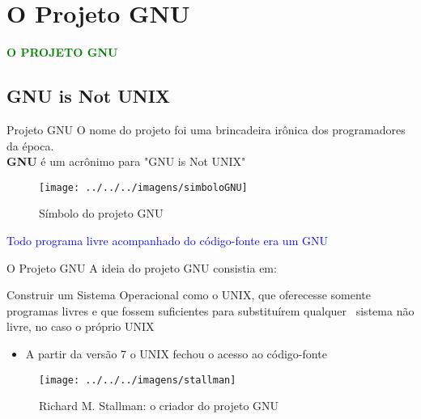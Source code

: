 \documentclass{beamer}
\begin{document}
\section{O Projeto GNU}
  \begin{frame}
     \begin{center}
        \Large{\textcolor{green}{\textbf{O PROJETO GNU}}}
     \end{center}
   \end{frame}
  \subsection{GNU is Not UNIX}
   \begin{frame}[t]{Projeto GNU}
      \centering
      O nome do projeto foi uma brincadeira irônica dos programadores da época. \\
      \vspace{\baselineskip}
      {\textbf{GNU} é um acrônimo para "\alert{G}NU is \alert{N}ot \alert{U}NIX"}
      {\begin{figure}
	\texttt{[image: ../../../imagens/simboloGNU]}
	\caption{Símbolo do projeto GNU}
      \end{figure}}
      {\begin{center}
	 \textcolor{blue}{Todo programa livre acompanhado do código-fonte era um GNU}
       \end{center}}
   \end{frame}

    \begin{frame}[t]{O Projeto GNU}
      A ideia do projeto GNU consistia em:
      \begin{itemize}
	\vspace{\baselineskip}
	{\item Construir um Sistema Operacional como o UNIX, que oferecesse somente programas livres e que fossem suficientes para substituírem qualquer \
	       sistema não livre, no caso o próprio UNIX}
	{\begin{itemize}
	 \item \alert{A partir da versão 7 o UNIX fechou o acesso ao código-fonte}
	\end{itemize}}
	{\begin{figure}
	  \texttt{[image: ../../../imagens/stallman]}
	  \caption{Richard M. Stallman: o criador do projeto GNU}
	\end{figure}}
      \end{itemize}
   \end{frame}
 
\end{document}
